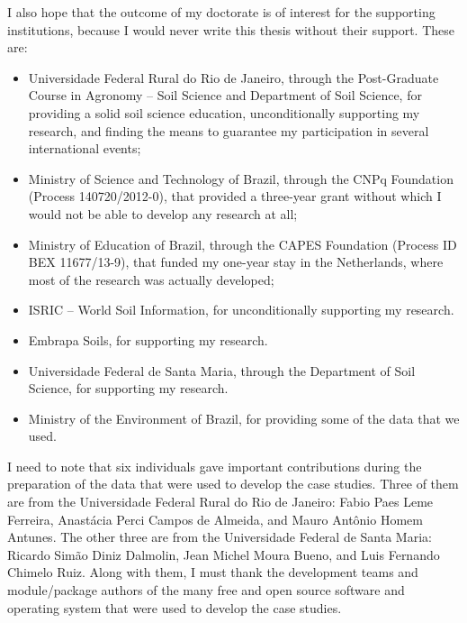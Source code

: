 I also hope that the outcome of my doctorate is of interest for the supporting institutions, 
because I would never write this thesis without their support. These are:

\begin{itemize}
 \item Universidade Federal Rural do Rio de Janeiro, through the Post-Graduate Course in Agronomy -- Soil 
 Science and Department of Soil Science, for providing a solid soil science education, unconditionally 
 supporting my research, and finding the means to guarantee my participation in several international events;
 
 \item Ministry of Science and Technology of Brazil, through the CNPq Foundation (Process 140720/2012-0), that
 provided a three-year grant without which I would not be able to develop any research at all;
 
 \item Ministry of Education of Brazil, through the CAPES Foundation (Process ID BEX 11677/13-9), that funded
 my one-year stay in the Netherlands, where most of the research was actually developed;
 
 \item ISRIC -- World Soil Information, for unconditionally supporting my research.
 
 \item Embrapa Soils, for supporting my research.
 
 \item Universidade Federal de Santa Maria, through the Department of Soil Science, for supporting my research.

 \item Ministry of the Environment of Brazil, for providing some of the data that we used.
\end{itemize}

I need to note that six individuals gave important contributions during the preparation of the 
data that were used to develop the case studies. Three of them are from the Universidade 
Federal Rural do Rio de Janeiro: Fabio Paes Leme Ferreira, Anastácia Perci Campos de Almeida, and Mauro Antônio 
Homem Antunes. The other three are from the Universidade Federal de Santa Maria: Ricardo Simão Diniz Dalmolin, 
Jean Michel Moura Bueno, and Luis Fernando Chimelo Ruiz. Along with them, I must thank the development teams 
and module/package authors of the many free and open source software and operating system that were used to 
develop the case studies.


